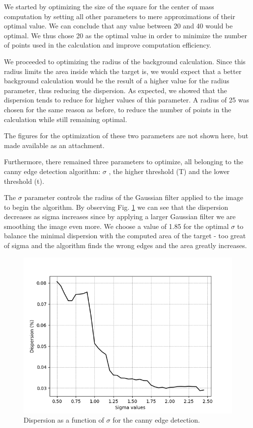 \documentclass{aa}
\begin{document}
We started by optimizing the size of the square for the center of mass computation by setting all other parameters to mere approximations of their optimal value. We can conclude that any value between 20 and 40 would be optimal. We thus chose 20 as the optimal value in order to minimize the number of points used in the calculation and improve computation efficiency.

We proceeded to optimizing the radius of the background calculation. Since this radius limits the area inside which the target is, we would expect that a better background calculation would be the result of a higher value for the radius parameter, thus reducing the dispersion. As expected, we showed that the dispersion tends to reduce for higher values of this parameter. A radius of 25 was chosen for the same reason as before, to reduce the number of points in the calculation while still remaining optimal.

The figures for the optimization of these two parameters are not shown here, but made available as an attachment.

Furthermore, there remained three parameters to optimize, all belonging to the canny edge detection algorithm: $\sigma$ , the higher threshold (T) and the lower threshold (t).

The $\sigma$ parameter controls the radius of the Gaussian filter applied to the image to begin the algorithm. By observing Fig. \ref{fig:sigma_opt} we can see that the dispersion decreases as sigma increases since by applying a larger Gaussian filter we are smoothing the image even more. We choose a value of 1.85 for the optimal $\sigma$ to balance the minimal dispersion with the computed area of the target - too great of sigma and the algorithm finds the wrong edges and the area greatly increases.

\begin{figure}[H]
\centering
\includegraphics[width=.4\textwidth]{dispersion_sigma.png}
\caption{Dispersion as a function of $\sigma$ for the canny edge detection.}
\label{fig:sigma_opt}
\end{figure}
\end{document}
